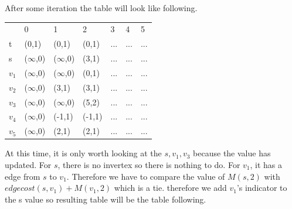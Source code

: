 \documentclass[a4paper,11pt]{article}
\begin{document}
\begin{enumerate}
After some iteration the table will look like following.

\begin{center}
\begin{tabular}{lllllll}
                       & 0                         & 1                     & 2                     & 3                     & 4                     & 5                     \\ \cline{2-7} 
\multicolumn{1}{l|}{t} & \multicolumn{1}{l|}{(0,1)} & \multicolumn{1}{l|}{(0,1)} & \multicolumn{1}{l|}{(0,1)} & \multicolumn{1}{l|}{...} & \multicolumn{1}{l|}{...} & \multicolumn{1}{l|}{...} \\ \cline{2-7} 
\multicolumn{1}{l|}{s} & \multicolumn{1}{l|}{($\infty$,0)} & \multicolumn{1}{l|}{($\infty$,0)} & \multicolumn{1}{l|}{(3,1)} & \multicolumn{1}{l|}{...} & \multicolumn{1}{l|}{...} & \multicolumn{1}{l|}{...} \\ \cline{2-7} 
\multicolumn{1}{l|}{$v_1$} & \multicolumn{1}{l|}{($\infty$,0)} & \multicolumn{1}{l|}{($\infty$,0)} & \multicolumn{1}{l|}{(0,1)} & \multicolumn{1}{l|}{...} & \multicolumn{1}{l|}{...} & \multicolumn{1}{l|}{...} \\ \cline{2-7} 
\multicolumn{1}{l|}{$v_2$} & \multicolumn{1}{l|}{($\infty$,0)} & \multicolumn{1}{l|}{(3,1)} & \multicolumn{1}{l|}{(3,1)} & \multicolumn{1}{l|}{...} & \multicolumn{1}{l|}{...} & \multicolumn{1}{l|}{...} \\ \cline{2-7} 
\multicolumn{1}{l|}{$v_3$} & \multicolumn{1}{l|}{($\infty$,0)} & \multicolumn{1}{l|}{($\infty$,0)} & \multicolumn{1}{l|}{(5,2)} & \multicolumn{1}{l|}{...} & \multicolumn{1}{l|}{...} & \multicolumn{1}{l|}{...} \\ \cline{2-7} 
\multicolumn{1}{l|}{$v_4$} & \multicolumn{1}{l|}{($\infty$,0)} & \multicolumn{1}{l|}{(-1,1)} & \multicolumn{1}{l|}{(-1,1)} & \multicolumn{1}{l|}{...} & \multicolumn{1}{l|}{...} & \multicolumn{1}{l|}{...} \\ \cline{2-7}  
\multicolumn{1}{l|}{$v_5$} & \multicolumn{1}{l|}{($\infty$,0)} & \multicolumn{1}{l|}{(2,1)} & \multicolumn{1}{l|}{(2,1)} & \multicolumn{1}{l|}{...} & \multicolumn{1}{l|}{...} & \multicolumn{1}{l|}{...} \\ \cline{2-7} 
\end{tabular}
\end{center}

At this time, it is only worth looking at the $s,v_1,v_3$ because the value has updated. For $s$, there is no invertex so there is nothing to do. For $v_1$, it has a edge from $s$ to $v_1$. Therefore we have to compare the value of $M(s,2)$ with $edgecost(s, v_1)+ M(v_1,2)$ which is a tie. therefore we add $v_1$'s indicator to the s value so resulting table will be the table following.


\end{enumerate}
\end{document}
